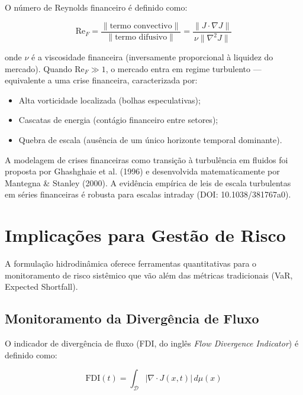 O n\'umero de Reynolds financeiro \'e definido como:

\begin{equation}\label{eq:reynolds-financeiro}
\text{Re}_F = \frac{\|\text{termo convectivo}\|}{\|\text{termo difusivo}\|} = \frac{\|J \cdot \nabla J\|}{\nu \|\nabla^2 J\|}
\end{equation}

onde $\nu$ \'e a viscosidade financeira (inversamente proporcional \`a liquidez do mercado). Quando $\text{Re}_F \gg 1$, o mercado entra em regime turbulento --- equivalente a uma crise financeira, caracterizada por:

\begin{itemize}
 \item Alta vorticidade localizada (bolhas especulativas);
 \item Cascatas de energia (cont\'agio financeiro entre setores);
 \item Quebra de escala (aus\^encia de um \'unico horizonte temporal dominante).
\end{itemize}

A modelagem de crises financeiras como transi\c{c}\~ao \`a turbul\^encia em fluidos foi proposta por Ghashghaie et al. (1996) e desenvolvida matematicamente por Mantegna \& Stanley (2000). A evid\^encia emp\'irica de leis de escala turbulentas em s\'eries financeiras \'e robusta para escalas intraday (DOI: 10.1038/381767a0).

\section{Implica\c{c}\~oes para Gest\~ao de Risco}

A formula\c{c}\~ao hidrodin\^amica oferece ferramentas quantitativas para o monitoramento de risco sist\^emico que v\~ao al\'em das m\'etricas tradicionais (VaR, Expected Shortfall).

\subsection{Monitoramento da Diverg\^encia de Fluxo}

O indicador de diverg\^encia de fluxo (FDI, do ingl\^es \textit{Flow Divergence Indicator}) \'e definido como:

\begin{equation}\label{eq:FDI}
\text{FDI}(t) = \int_{\mathcal{D}} |\nabla \cdot J(x,t)| \, d\mu(x)
\end{equation}

